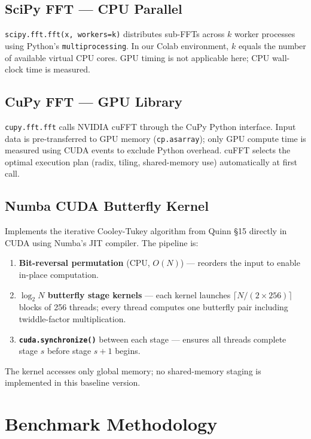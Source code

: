 \documentclass[12pt, letterpaper]{article}
\begin{document}
\subsection{SciPy FFT --- CPU Parallel}

\texttt{scipy.fft.fft(x, workers=k)} distributes sub-FFTs across $k$ worker processes using Python's \texttt{multiprocessing}. In our Colab environment, $k$ equals the number of available virtual CPU cores. GPU timing is not applicable here; CPU wall-clock time is measured.

\subsection{CuPy FFT --- GPU Library}

\texttt{cupy.fft.fft} calls NVIDIA cuFFT through the CuPy Python interface. Input data is pre-transferred to GPU memory (\texttt{cp.asarray}); only GPU compute time is measured using CUDA events to exclude Python overhead. cuFFT selects the optimal execution plan (radix, tiling, shared-memory use) automatically at first call.

\subsection{Numba CUDA Butterfly Kernel}

Implements the iterative Cooley-Tukey algorithm from Quinn \S 15 directly in CUDA using Numba's JIT compiler. The pipeline is:

\begin{enumerate}
    \item \textbf{Bit-reversal permutation} (CPU, $O(N)$) --- reorders the input to enable in-place computation.
    \item \textbf{$\log_2 N$ butterfly stage kernels} --- each kernel launches $\lceil N/(2 \times 256) \rceil$ blocks of 256 threads; every thread computes one butterfly pair including twiddle-factor multiplication.
    \item \textbf{\texttt{cuda.synchronize()}} between each stage --- ensures all threads complete stage $s$ before stage $s+1$ begins.
\end{enumerate}

The kernel accesses only global memory; no shared-memory staging is implemented in this baseline version.

\section{Benchmark Methodology}
\label{sec:method}
\end{document}
